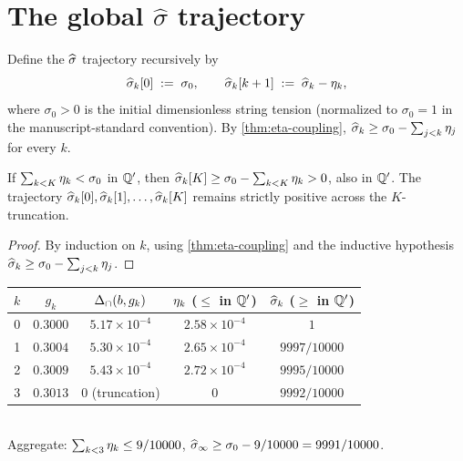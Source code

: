 \section{The global $\widehat\sigma$ trajectory}
\label{sec:sigma-hat-global}

%

Define the $\widehat{\sigma}$ trajectory recursively by
\begin{equation}
  \label{eq:sigma-hat-recursion}
  \widehat{\sigma}_k[0] \;:=\; \sigma_0,
  \qquad
  \widehat{\sigma}_k[k+1] \;:=\; \widehat{\sigma}_k - \eta_k,
\end{equation}
where $\sigma_0 > 0$ is the initial dimensionless string tension
(normalized to $\sigma_0 = 1$ in the manuscript-standard
convention).  By \cref{thm:eta-coupling},
$\widehat{\sigma}_k \ge \sigma_0 - \sum_{j < k} \eta_j$ for every $k$.

\begin{theorem}
\label{thm:budget-closure}
If $\sum_{k < K} \eta_k < \sigma_0$ in $\mathbb{Q}'$, then
$\widehat{\sigma}_k[K] \ge \sigma_0 - \sum_{k < K} \eta_k > 0$, also in $\mathbb{Q}'$.
The trajectory $\widehat{\sigma}_k[0], \widehat{\sigma}_k[1], \dots, \widehat{\sigma}_k[K]$ remains
strictly positive across the $K$-truncation.
\end{theorem}

\begin{proof}
By induction on $k$, using \cref{thm:eta-coupling} and the
inductive hypothesis $\widehat{\sigma}_k \ge \sigma_0 - \sum_{j < k} \eta_j$.
\end{proof}

\begin{infobox}[main][title={Canonical pilot, $g_0 = 0.30$, $K = 3$}]
\centering
\renewcommand{\arraystretch}{1.15}
\begin{tabular}{rcccc}
\toprule
$k$ & $g_k$    & $\Delta_{\cap}(b, g_k)$ & $\eta_k$ ($\le$ in $\mathbb{Q}'$)  & $\widehat{\sigma}_k$ ($\ge$ in $\mathbb{Q}'$) \\
\midrule
0   & $0.3000$ & $5.17\times 10^{-4}$ & $2.58\times 10^{-4}$ & $1$                          \\
1   & $0.3004$ & $5.30\times 10^{-4}$ & $2.65\times 10^{-4}$ & $9997/10000$                 \\
2   & $0.3009$ & $5.43\times 10^{-4}$ & $2.72\times 10^{-4}$ & $9995/10000$                 \\
3   & $0.3013$ & $0$ (truncation)     & $0$                  & $9992/10000$                 \\
\bottomrule
\end{tabular}
\vspace{0.3em}\\
Aggregate: $\sum_{k < 3} \eta_k \le 9/10000$,
$\widehat{\sigma}_\infty \ge \sigma_0 - 9/10000 = 9991/10000$.
\end{infobox}

